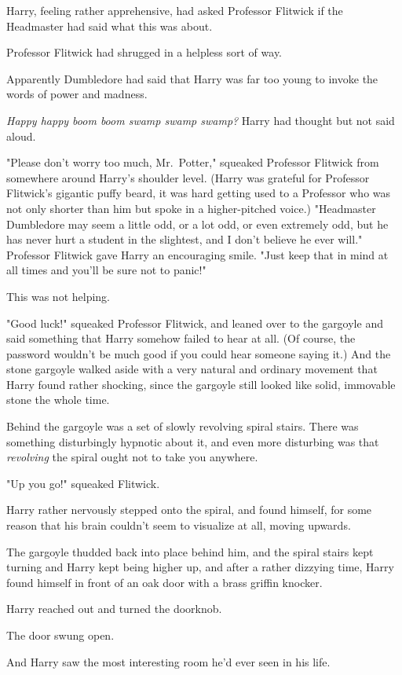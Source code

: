 Harry, feeling rather apprehensive, had asked Professor Flitwick if the
Headmaster had said what this was about.

Professor Flitwick had shrugged in a helpless sort of way.

Apparently Dumbledore had said that Harry was far too young to invoke the words
of power and madness.

\emph{Happy happy boom boom swamp swamp swamp?} Harry had thought but not said
aloud.

"Please don't worry too much, Mr.~Potter," squeaked Professor Flitwick from
somewhere around Harry's shoulder level. (Harry was grateful for Professor
Flitwick's gigantic puffy beard, it was hard getting used to a Professor who
was not only shorter than him but spoke in a higher-pitched voice.) "Headmaster
Dumbledore may seem a little odd, or a lot odd, or even extremely odd, but he
has never hurt a student in the slightest, and I don't believe he ever will."
Professor Flitwick gave Harry an encouraging smile. "Just keep that in mind at
all times and you'll be sure not to panic!"

This was not helping.

"Good luck!" squeaked Professor Flitwick, and leaned over to the gargoyle and
said something that Harry somehow failed to hear at all. (Of course, the
password wouldn't be much good if you could hear someone saying it.) And the
stone gargoyle walked aside with a very natural and ordinary movement that
Harry found rather shocking, since the gargoyle still looked like solid,
immovable stone the whole time.

Behind the gargoyle was a set of slowly revolving spiral stairs. There was
something disturbingly hypnotic about it, and even more disturbing was that
\emph{revolving} the spiral ought not to take you anywhere.

"Up you go!" squeaked Flitwick.

Harry rather nervously stepped onto the spiral, and found himself, for some
reason that his brain couldn't seem to visualize at all, moving upwards.

The gargoyle thudded back into place behind him, and the spiral stairs kept
turning and Harry kept being higher up, and after a rather dizzying time, Harry
found himself in front of an oak door with a brass griffin knocker.

Harry reached out and turned the doorknob.

The door swung open.

And Harry saw the most interesting room he'd ever seen in his life.

